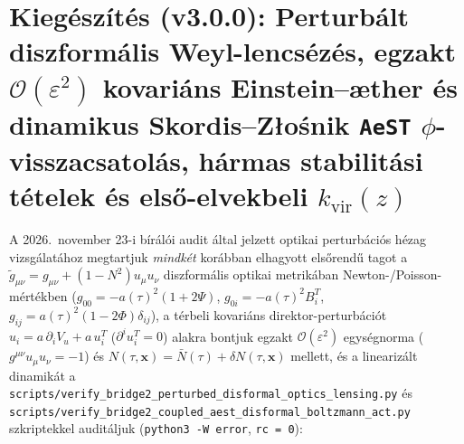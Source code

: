 \documentclass[11pt,a4paper]{article}
\begin{document}
\section{Kiegészítés (v3.0.0): Perturbált diszformális Weyl-lencsézés, egzakt \texorpdfstring{$\mathcal{O}(\varepsilon^2)$}{O(eps2)} kovariáns Einstein--\texorpdfstring{\ae{}}{ae}ther és dinamikus Skordis--Z\texorpdfstring{{\l}o\'s}{los}nik \texorpdfstring{\texttt{AeST}}{AeST} \texorpdfstring{$\phi$}{phi}-visszacsatolás, hármas stabilitási tételek és első-elvekbeli \texorpdfstring{$k_{\mathrm{vir}}(z)$}{k\_vir(z)}}
\label{sec:v21-bridge2-hu}
A 2026.\ november 23-i bírálói audit által jelzett optikai perturbációs hézag vizsgálatához megtartjuk \emph{mindkét} korábban elhagyott elsőrendű tagot a $\tilde{g}_{\mu\nu} = g_{\mu\nu} + (1 - N^2) u_\mu u_\nu$ diszformális optikai metrikában Newton-/Poisson-mértékben ($g_{00} = -a(\tau)^2(1+2\Psi)$, $g_{0i} = -a(\tau)^2 B_i^T$, $g_{ij} = a(\tau)^2(1-2\Phi)\delta_{ij}$), a térbeli kovariáns direktor-perturbációt $u_i = a\,\partial_i V_u + a\,u_i^T$ ($\partial^i u_i^T = 0$) alakra bontjuk egzakt $\mathcal{O}(\varepsilon^2)$ egységnorma ($g^{\mu\nu}u_\mu u_\nu = -1$) és $N(\tau,\mathbf{x}) = \bar{N}(\tau) + \delta N(\tau,\mathbf{x})$ mellett, és a linearizált dinamikát a \texttt{scripts/\allowbreak verify\_\allowbreak bridge2\_\allowbreak perturbed\_\allowbreak disformal\_\allowbreak optics\_\allowbreak lensing.py} és \texttt{scripts/\allowbreak verify\_\allowbreak bridge2\_\allowbreak coupled\_\allowbreak aest\_\allowbreak disformal\_\allowbreak boltzmann\_\allowbreak act.py} szkriptekkel auditáljuk (\texttt{python3 -W error}, \texttt{rc = 0}):
\end{document}

